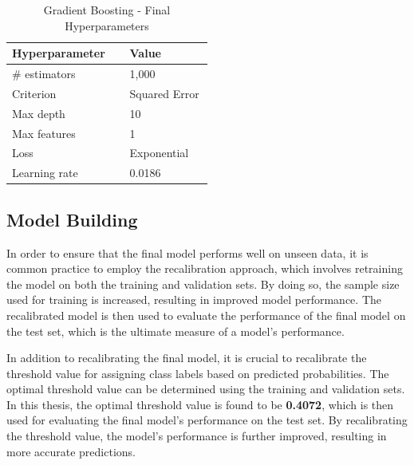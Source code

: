 \begin{table}[H]
    \small
    \setlength{\tabcolsep}{8pt}
    \renewcommand{\arraystretch}{1.3}
    \centering
        \caption[Gradient Boosting - Final Hyperparameters]{Gradient Boosting - Final Hyperparameters}\label{tab:finalhyp}
        \begin{tabular}{p{0.25\linewidth}p{0.25\linewidth}}
    \toprule
    \textbf{Hyperparameter} & \textbf{Value}\\
    \midrule
    \hline
    \# estimators & 1,000 \\
    Criterion & Squared Error \\
    Max depth & 10 \\
    Max features & 1 \\
    Loss & Exponential \\
    Learning rate & 0.0186 \\
    \hline
    \bottomrule
    \end{tabular}
    \vspace{0.7em}

    \vspace{-1em}
\end{table}

\subsection{Model Building}

In order to ensure that the final model performs well on unseen data, it is common practice to employ the recalibration approach, which involves retraining the model on both the training and validation sets.
By doing so, the sample size used for training is increased, resulting in improved model performance.
The recalibrated model is then used to evaluate the performance of the final model on the test set, which is the ultimate measure of a model's performance.

In addition to recalibrating the final model, it is crucial to recalibrate the threshold value for assigning class labels based on predicted probabilities. The optimal threshold value can be determined using the training and validation sets.
In this thesis, the optimal threshold value is found to be \textbf{0.4072}, which is then used for evaluating the final model's performance on the test set.
By recalibrating the threshold value, the model's performance is further improved, resulting in more accurate predictions.


